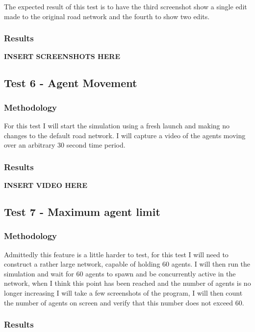             The expected result of this test is to have the third screenshot show a single edit made to the original road network and the fourth to show two edits.

        \subsubsection{Results}

            \textbf{INSERT SCREENSHOTS HERE}

    \subsection{Test 6 - Agent Movement}

        \subsubsection{Methodology}

            For this test I will start the simulation using a fresh launch and making no changes to the default road network. I will capture a video of the agents moving over an arbitrary 30 second time period.

        \subsubsection{Results}

            \textbf{INSERT VIDEO HERE}

    \subsection{Test 7 - Maximum agent limit}

        \subsubsection{Methodology}

            Admittedly this feature is a little harder to test, for this test I will need to construct a rather large network, capable of holding 60 agents. I will then run the simulation and wait for 60 agents to spawn and be concurrently active in the network, when I think this point has been reached and the number of agents is no longer increasing I will take a few screenshots of the program, I will then count the number of agents on screen and verify that this number does not exceed 60.

        \subsubsection{Results}

